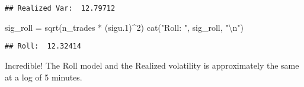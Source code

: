\documentclass[
]{article}
\newenvironment{Shaded}{\begin{snugshade}}{\end{snugshade}}
\newcommand{\DecValTok}[1]{\textcolor[rgb]{0.00,0.00,0.81}{#1}}
\newcommand{\FloatTok}[1]{\textcolor[rgb]{0.00,0.00,0.81}{#1}}
\newcommand{\FunctionTok}[1]{\textcolor[rgb]{0.00,0.00,0.00}{#1}}
\newcommand{\NormalTok}[1]{#1}
\newcommand{\OtherTok}[1]{\textcolor[rgb]{0.56,0.35,0.01}{#1}}
\newcommand{\SpecialCharTok}[1]{\textcolor[rgb]{0.00,0.00,0.00}{#1}}
\newcommand{\StringTok}[1]{\textcolor[rgb]{0.31,0.60,0.02}{#1}}
\begin{document}
\begin{verbatim}
## Realized Var:  12.79712
\end{verbatim}

\begin{Shaded}
\begin{Highlighting}[]
\NormalTok{sig\_roll }\OtherTok{=} \FunctionTok{sqrt}\NormalTok{(n\_trades }\SpecialCharTok{*}\NormalTok{ (sigu}\FloatTok{.1}\NormalTok{)}\SpecialCharTok{\^{}}\DecValTok{2}\NormalTok{)}
\FunctionTok{cat}\NormalTok{(}\StringTok{"Roll: "}\NormalTok{, sig\_roll, }\StringTok{"}\SpecialCharTok{\textbackslash{}n}\StringTok{"}\NormalTok{)}
\end{Highlighting}
\end{Shaded}

\begin{verbatim}
## Roll:  12.32414
\end{verbatim}

Incredible! The Roll model and the Realized volatility is approximately
the same at a log of 5 minutes.
\end{document}
